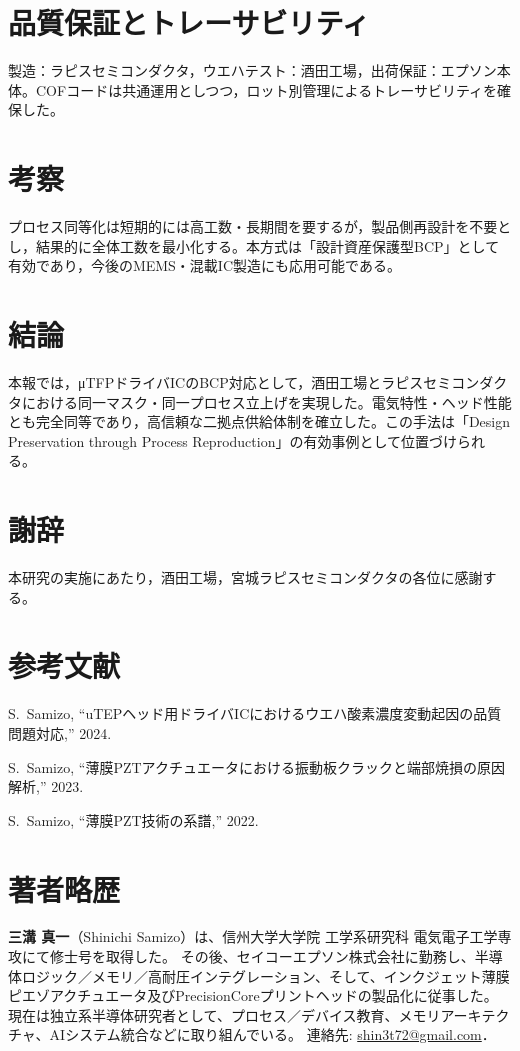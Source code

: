 \documentclass[conference]{IEEEtran}
\begin{document}
\section{品質保証とトレーサビリティ}
製造：ラピスセミコンダクタ，ウエハテスト：酒田工場，出荷保証：エプソン本体。COFコードは共通運用としつつ，ロット別管理によるトレーサビリティを確保した。

\section{考察}
プロセス同等化は短期的には高工数・長期間を要するが，製品側再設計を不要とし，結果的に全体工数を最小化する。本方式は「設計資産保護型BCP」として有効であり，今後のMEMS・混載IC製造にも応用可能である。

\section{結論}
本報では，μTFPドライバICのBCP対応として，酒田工場とラピスセミコンダクタにおける同一マスク・同一プロセス立上げを実現した。電気特性・ヘッド性能とも完全同等であり，高信頼な二拠点供給体制を確立した。この手法は「Design Preservation through Process Reproduction」の有効事例として位置づけられる。

\section*{謝辞}
本研究の実施にあたり，酒田工場，宮城ラピスセミコンダクタの各位に感謝する。

\section*{参考文献}
\begin{thebibliography}{99}
S.~Samizo, ``uTEPヘッド用ドライバICにおけるウエハ酸素濃度変動起因の品質問題対応,'' 2024.

S.~Samizo, ``薄膜PZTアクチュエータにおける振動板クラックと端部焼損の原因解析,'' 2023.

S.~Samizo, ``薄膜PZT技術の系譜,'' 2022.
\end{thebibliography}

\section*{著者略歴}
\textbf{三溝 真一}（Shinichi Samizo）は、信州大学大学院 工学系研究科 電気電子工学専攻にて修士号を取得した。  
その後、セイコーエプソン株式会社に勤務し、半導体ロジック／メモリ／高耐圧インテグレーション、そして、インクジェット薄膜ピエゾアクチュエータ及びPrecisionCoreプリントヘッドの製品化に従事した。  
現在は独立系半導体研究者として、プロセス／デバイス教育、メモリアーキテクチャ、AIシステム統合などに取り組んでいる。  
連絡先: \href{mailto:shin3t72@gmail.com}{shin3t72@gmail.com}．
\end{document}
